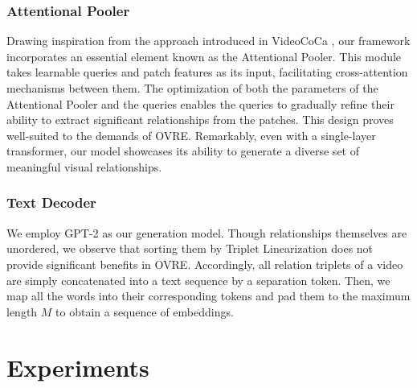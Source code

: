 \documentclass[letterpaper]{article}
\begin{document}
\subsubsection{Attentional Pooler}
Drawing inspiration from the approach introduced in VideoCoCa \cite{yan2023videococa},
our framework incorporates an essential element known as the Attentional Pooler. This module takes learnable queries and patch features as its input, facilitating cross-attention mechanisms between them.
The optimization of both the parameters of the Attentional Pooler and the queries enables the queries to gradually refine their ability to extract significant relationships from the patches. This design proves well-suited to the demands of OVRE. Remarkably, even with a single-layer transformer, our model showcases its ability to generate a diverse set of meaningful visual relationships.



\subsubsection{Text Decoder}
We employ GPT-2 \cite{radford2019language} as our generation model.
Though relationships themselves are unordered, we observe that sorting them by Triplet Linearization \cite{cabot2021rebel} does not provide significant benefits in OVRE.
Accordingly, all relation triplets of a video are simply concatenated into a text sequence by a separation token.
Then, we map all the words into their corresponding tokens and pad them to the maximum length $M$ to obtain a sequence of embeddings.

\section{Experiments}
\end{document}
